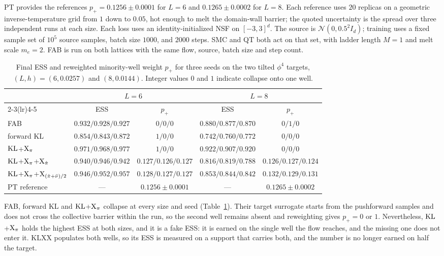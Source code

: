 \documentclass{article}
\begin{document}
PT provides the references $p_+=0.1256\pm0.0001$ for $L=6$ and $0.1265\pm0.0002$ for $L=8$. Each reference uses $20$ replicas on a geometric inverse-temperature grid from $1$ down to $0.05$, hot enough to melt the domain-wall barrier; the quoted uncertainty is the spread over three independent runs at each size. Each loss uses an identity-initialized NSF on $[-3,3]^d$. The source is $\mathcal N(0,0.5^2 I_d)$; training uses a fixed sample set of $10^5$ source samples, batch size $1000$, and $2000$ steps. SMC and QT both act on that set, with ladder length $M=1$ and melt scale $m_e=2$. FAB is run on both lattices with the same flow, source, batch size and step count.

\begin{table}[htb]
    \centering
    \begin{tabular}{lcccc}
        \toprule
        & \multicolumn{2}{c}{$L=6$} & \multicolumn{2}{c}{$L=8$} \\
        \cmidrule(lr){2-3}\cmidrule(lr){4-5}
        & ESS & $p_+$ & ESS & $p_+$ \\
        \midrule
        FAB
        & $0.932/0.928/0.927$ & $0/0/0$
        & $0.880/0.877/0.870$ & $0/1/0$ \\
        forward KL
        & $0.854/0.843/0.872$ & $1/0/0$
        & $0.742/0.760/0.772$ & $0/0/0$ \\
        $\mathrm{KL}$+$\mathrm{X}_\pi$
        & $0.971/0.968/0.977$ & $1/0/0$
        & $0.922/0.907/0.920$ & $0/0/0$ \\
        $\mathrm{KL}$+$\mathrm{X}_\pi$+$\mathrm{X}_{\hat\pi}$
        & $0.940/0.946/0.942$ & $0.127/0.126/0.127$
        & $0.816/0.819/0.788$ & $0.126/0.127/0.124$ \\
        $\mathrm{KL}$+$\mathrm{X}_\pi$+$\mathrm{X}_{(\hat\pi+\bar\nu)/2}$
        & $0.946/0.952/0.957$ & $0.128/0.127/0.127$
        & $0.853/0.844/0.842$ & $0.132/0.129/0.131$ \\
        \midrule
        PT reference & --- & $0.1256\pm0.0001$ & --- & $0.1265\pm0.0002$ \\
        \bottomrule
    \end{tabular}
    \caption{Final ESS and reweighted minority-well weight $p_+$ for three seeds on the two tilted $\phi^4$ targets, $(L,h)=(6,0.0257)$ and $(8,0.0144)$. Integer values $0$ and $1$ indicate collapse onto one well.}
    \label{tab: phi4}
\end{table}

FAB, forward KL and $\mathrm{KL}$+$\mathrm{X}_\pi$ collapse at every size and seed (Table~\ref{tab: phi4}). Their target surrogate starts from the pushforward samples and does not cross the collective barrier within the run, so the second well remains absent and reweighting gives $p_+=0$ or $1$. Nevertheless, $\mathrm{KL}$+$\mathrm{X}_\pi$ holds the highest ESS at both sizes, and it is a fake ESS: it is earned on the single well the flow reaches, and the missing one does not enter it. KLXX populates both wells, so its ESS is measured on a support that carries both, and the number is no longer earned on half the target.
\end{document}

